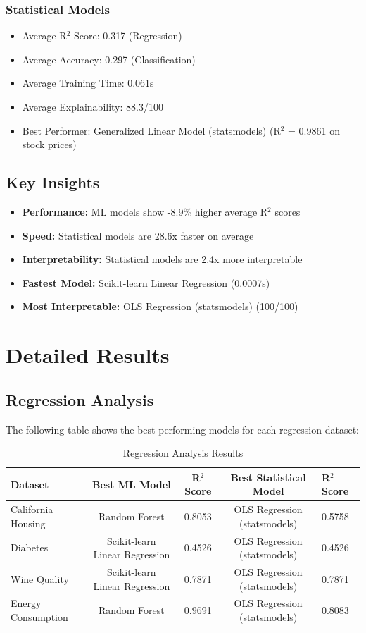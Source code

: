 \documentclass[11pt,a4paper]{article}
\begin{document}
\subsubsection{Statistical Models}
\begin{itemize}
\item Average R$^2$ Score: 0.317 (Regression)
\item Average Accuracy: 0.297 (Classification)
\item Average Training Time: 0.061s
\item Average Explainability: 88.3/100
\item Best Performer: Generalized Linear Model (statsmodels) (R$^2$ = 0.9861 on stock prices)
\end{itemize}

\subsection{Key Insights}

\begin{itemize}
\item \textbf{Performance:} ML models show -8.9\% higher average R$^2$ scores
\item \textbf{Speed:} Statistical models are 28.6x faster on average
\item \textbf{Interpretability:} Statistical models are 2.4x more interpretable
\item \textbf{Fastest Model:} Scikit-learn Linear Regression (0.0007s)
\item \textbf{Most Interpretable:} OLS Regression (statsmodels) (100/100)
\end{itemize}

\section{Detailed Results}

\subsection{Regression Analysis}

The following table shows the best performing models for each regression dataset:

\begin{table}[h!]
\centering
\begin{tabular}{lccc}
\toprule
Dataset & Best ML Model & R$^2$ Score & Best Statistical Model & R$^2$ Score \\
\midrule
California Housing & Random Forest & 0.8053 & OLS Regression (statsmodels) & 0.5758 \\
Diabetes & Scikit-learn Linear Regression & 0.4526 & OLS Regression (statsmodels) & 0.4526 \\
Wine Quality & Scikit-learn Linear Regression & 0.7871 & OLS Regression (statsmodels) & 0.7871 \\
Energy Consumption & Random Forest & 0.9691 & OLS Regression (statsmodels) & 0.8083 \\
\bottomrule
\end{tabular}
\caption{Regression Analysis Results}
\end{table}
\end{document}
